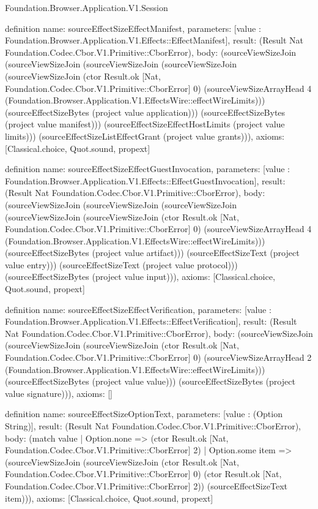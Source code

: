 \begin{lexlean}{Foundation.Browser.Application.V1.Session}
\begin{semanticmodule}
definition{
  name: sourceEffectSizeEffectManifest,
  parameters: [value : Foundation.Browser.Application.V1.Effects::EffectManifest],
  result: (Result Nat Foundation.Codec.Cbor.V1.Primitive::CborError),
  body: (sourceViewSizeJoin (sourceViewSizeJoin (sourceViewSizeJoin (sourceViewSizeJoin (sourceViewSizeJoin (ctor Result.ok [Nat, Foundation.Codec.Cbor.V1.Primitive::CborError] 0) (sourceViewSizeArrayHead 4 (Foundation.Browser.Application.V1.EffectsWire::effectWireLimits))) (sourceEffectSizeBytes (project value application))) (sourceEffectSizeBytes (project value manifest))) (sourceEffectSizeEffectHostLimits (project value limits))) (sourceEffectSizeListEffectGrant (project value grants))),
  axioms: [Classical.choice, Quot.sound, propext]
}

definition{
  name: sourceEffectSizeEffectGuestInvocation,
  parameters: [value : Foundation.Browser.Application.V1.Effects::EffectGuestInvocation],
  result: (Result Nat Foundation.Codec.Cbor.V1.Primitive::CborError),
  body: (sourceViewSizeJoin (sourceViewSizeJoin (sourceViewSizeJoin (sourceViewSizeJoin (sourceViewSizeJoin (ctor Result.ok [Nat, Foundation.Codec.Cbor.V1.Primitive::CborError] 0) (sourceViewSizeArrayHead 4 (Foundation.Browser.Application.V1.EffectsWire::effectWireLimits))) (sourceEffectSizeBytes (project value artifact))) (sourceEffectSizeText (project value entry))) (sourceEffectSizeText (project value protocol))) (sourceEffectSizeBytes (project value input))),
  axioms: [Classical.choice, Quot.sound, propext]
}

definition{
  name: sourceEffectSizeEffectVerification,
  parameters: [value : Foundation.Browser.Application.V1.Effects::EffectVerification],
  result: (Result Nat Foundation.Codec.Cbor.V1.Primitive::CborError),
  body: (sourceViewSizeJoin (sourceViewSizeJoin (sourceViewSizeJoin (ctor Result.ok [Nat, Foundation.Codec.Cbor.V1.Primitive::CborError] 0) (sourceViewSizeArrayHead 2 (Foundation.Browser.Application.V1.EffectsWire::effectWireLimits))) (sourceEffectSizeBytes (project value value))) (sourceEffectSizeBytes (project value signature))),
  axioms: []
}

definition{
  name: sourceEffectSizeOptionText,
  parameters: [value : (Option String)],
  result: (Result Nat Foundation.Codec.Cbor.V1.Primitive::CborError),
  body: (match value
    | Option.none => (ctor Result.ok [Nat, Foundation.Codec.Cbor.V1.Primitive::CborError] 2)
    | Option.some item => (sourceViewSizeJoin (sourceViewSizeJoin (ctor Result.ok [Nat, Foundation.Codec.Cbor.V1.Primitive::CborError] 0) (ctor Result.ok [Nat, Foundation.Codec.Cbor.V1.Primitive::CborError] 2)) (sourceEffectSizeText item))),
  axioms: [Classical.choice, Quot.sound, propext]
}


\end{semanticmodule}
\end{lexlean}
